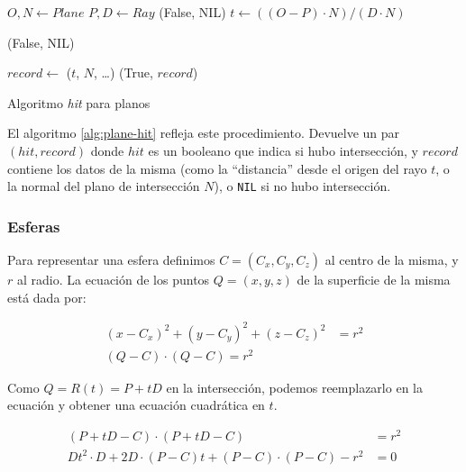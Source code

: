 \begin{algorithm}[H]
  \begin{algorithmic}[1]
    \State $O, N \gets Plane$ 
    \State $P, D \gets Ray$ 
     
    \State \Return (False, NIL)
    \EndIf
    \State $t \gets ((O - P) \cdot N)/(D \cdot N)$

     
    \State \Return (False, NIL)
    \EndIf

    \State $record \gets$ ($t$, $N$, \dots) 
    \State \Return (True, $record$)
    \EndFunction
  \end{algorithmic}
  \caption{Algoritmo \textit{hit} para planos}
  \label{alg:plane-hit}
\end{algorithm}

El algoritmo \ref{alg:plane-hit} refleja este procedimiento. Devuelve un par
$(hit, record)$ donde $hit$ es un booleano que indica si hubo intersección, y
$record$ contiene los datos de la misma (como la ``distancia'' desde el origen
del rayo $t$, o la normal del plano de intersección $N$), o \texttt{NIL} si no
hubo intersección.

\subsubsection{Esferas}

Para representar una esfera definimos $C = (C_x, C_y, C_z)$ al centro de la
misma, y $r$ al radio. La ecuación de los puntos $Q=(x, y, z)$ de la superficie
de la misma está dada por:

\begin{align*}
  (x - C_x)^2 + (y - C_y)^2 + (z - C_z)^2 & = r^2 \\
  (Q - C) \cdot (Q - C) = r^2
\end{align*}

Como $Q = R(t) = P + tD$ en la intersección, podemos reemplazarlo en la ecuación
y obtener una ecuación cuadrática en $t$.

\begin{align*}
  (P + tD - C) \cdot (P + tD - C)                                  & = r^2 \\
  D t^2 \cdot D + 2D \cdot (P - C) t + (P - C) \cdot (P - C) - r^2 & = 0
  \label{eq:cuad-esfera}
\end{align*}

